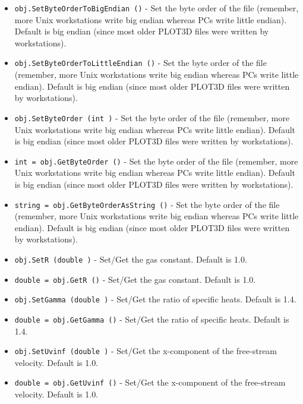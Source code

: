 \begin{itemize}
\item  \verb|obj.SetByteOrderToBigEndian ()| -  Set the byte order of the file (remember, more Unix workstations
 write big endian whereas PCs write little endian). Default is
 big endian (since most older PLOT3D files were written by
 workstations).

\item  \verb|obj.SetByteOrderToLittleEndian ()| -  Set the byte order of the file (remember, more Unix workstations
 write big endian whereas PCs write little endian). Default is
 big endian (since most older PLOT3D files were written by
 workstations).

\item  \verb|obj.SetByteOrder (int )| -  Set the byte order of the file (remember, more Unix workstations
 write big endian whereas PCs write little endian). Default is
 big endian (since most older PLOT3D files were written by
 workstations).

\item  \verb|int = obj.GetByteOrder ()| -  Set the byte order of the file (remember, more Unix workstations
 write big endian whereas PCs write little endian). Default is
 big endian (since most older PLOT3D files were written by
 workstations).

\item  \verb|string = obj.GetByteOrderAsString ()| -  Set the byte order of the file (remember, more Unix workstations
 write big endian whereas PCs write little endian). Default is
 big endian (since most older PLOT3D files were written by
 workstations).

\item  \verb|obj.SetR (double )| -  Set/Get the gas constant. Default is 1.0.

\item  \verb|double = obj.GetR ()| -  Set/Get the gas constant. Default is 1.0.

\item  \verb|obj.SetGamma (double )| -  Set/Get the ratio of specific heats. Default is 1.4.

\item  \verb|double = obj.GetGamma ()| -  Set/Get the ratio of specific heats. Default is 1.4.

\item  \verb|obj.SetUvinf (double )| -  Set/Get the x-component of the free-stream velocity. Default is 1.0.

\item  \verb|double = obj.GetUvinf ()| -  Set/Get the x-component of the free-stream velocity. Default is 1.0.


\end{itemize}
